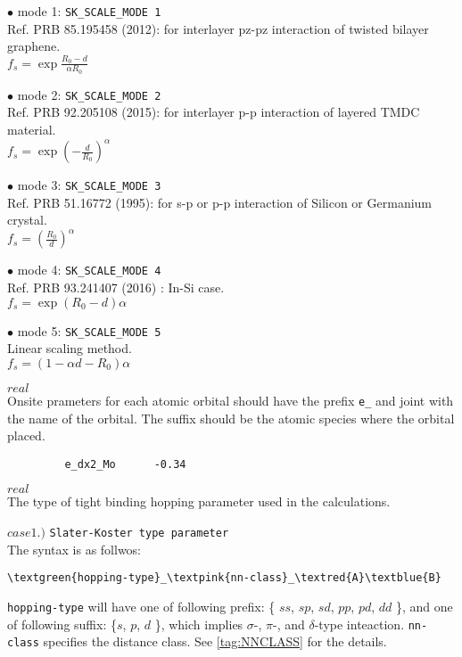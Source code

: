 \documentclass[a4paper,12pt]{scrartcl}
\makeatletter
\def\namedlabel#1#2{\begingroup
    #2%
    \def\@currentlabel{#2}%
    \phantomsection\label{#1}\endgroup
}
\newcommand{\textred}[1]{\textcolor{red!85!white}{\texttt{#1}}}
\newcommand{\textblue}[1]{\textcolor{blue!85!white}{\texttt{#1}}}
\newcommand{\textgreen}[1]{\textcolor{green!50!black}{\texttt{#1}}}
\newcommand{\textpink}[1]{\textcolor{red!60!yellow}{\texttt{#1}}}
\makeatother
\begin{document}
\begin{description}
		\item $\bullet$ mode 1: \texttt{SK\_SCALE\_MODE 1} \\
		 Ref. PRB 85.195458 (2012): for interlayer pz-pz interaction of twisted bilayer graphene. \\
		  $f_s = \exp{ \frac{R_0 - d}{\alpha R_0} }$ 
		\item $\bullet$ mode 2: \texttt{SK\_SCALE\_MODE 2} \\
		 Ref. PRB 92.205108 (2015): for interlayer p-p interaction of layered TMDC material. \\
		  $f_s = \exp{ (-\frac{d}{R_0})^\alpha }$ 
		\item $\bullet$ mode 3: \texttt{SK\_SCALE\_MODE 3} \\
		 Ref. PRB 51.16772 (1995): for s-p or p-p interaction of Silicon or Germanium crystal. \\
		  $f_s = (\frac{R_0}{d})^\alpha$ 
		\item $\bullet$ mode 4: \texttt{SK\_SCALE\_MODE 4} \\
		 Ref. PRB 93.241407 (2016) : In-Si case. \\
		  $f_s = \exp ({R_0 - d})\alpha$ 
		\item $\bullet$ mode 5: \texttt{SK\_SCALE\_MODE 5} \\
		 Linear scaling method. \\
		  $f_s = (1 - \alpha {d - R_0})\alpha$ 
		
    \item[\namedlabel{tag:param-onsite}{ONSITE parameters}] $real$ \\
		Onsite prameters for each atomic orbital should have the prefix
		\textgreen{e\_} and joint with the name of the orbital. The suffix
		should be the atomic species where the orbital placed.
        \begin{verbatim}
         e_dx2_Mo      -0.34
        \end{verbatim}

    \item[\namedlabel{tag:hopping_type}{HOPPING parameters type}] $real$ \\
        The type of tight binding hopping parameter used in the calculations.

		\subitem $case 1.)$ \texttt{Slater-Koster type parameter} \\
		 The syntax is as follwos:
        \begin{Verbatim}[commandchars=\\\{\}]
         \textgreen{hopping-type}_\textpink{nn-class}_\textred{A}\textblue{B}
        \end{Verbatim}
		\texttt{hopping-type} will have one of following prefix: \{ $ss$, $sp$, $sd$, $pp$, 
		$pd$, $dd$ \}, and one of following suffix: \{$s$, $p$, $d$ \}, which implies
		$\sigma$-, $\pi$-, and $\delta$-type inteaction.
		\textpink{nn-class} specifies the distance class. See \ref{tag:NNCLASS} for the 
		details.


\end{description}
\end{document}
